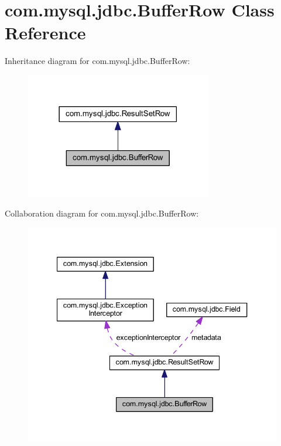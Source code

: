 \hypertarget{classcom_1_1mysql_1_1jdbc_1_1_buffer_row}{}\section{com.\+mysql.\+jdbc.\+Buffer\+Row Class Reference}
\label{classcom_1_1mysql_1_1jdbc_1_1_buffer_row}


Inheritance diagram for com.\+mysql.\+jdbc.\+Buffer\+Row\+:\nopagebreak
\begin{figure}[H]
\begin{center}
\leavevmode
\includegraphics[width=230pt]{classcom_1_1mysql_1_1jdbc_1_1_buffer_row__inherit__graph}
\end{center}
\end{figure}


Collaboration diagram for com.\+mysql.\+jdbc.\+Buffer\+Row\+:\nopagebreak
\begin{figure}[H]
\begin{center}
\leavevmode
\includegraphics[width=340pt]{classcom_1_1mysql_1_1jdbc_1_1_buffer_row__coll__graph}
\end{center}
\end{figure}
